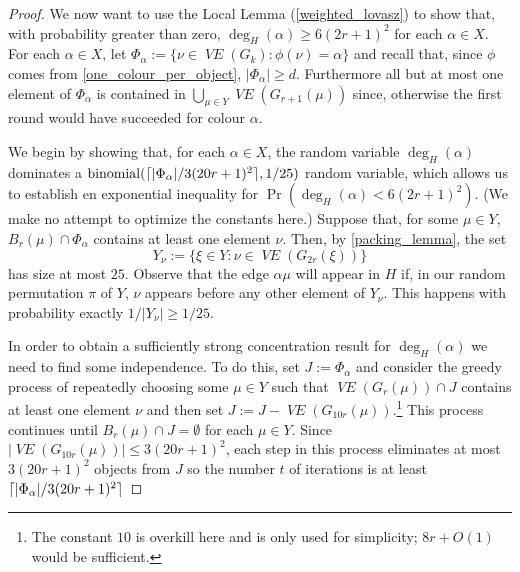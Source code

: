 \documentclass{patmorin}
\DeclareMathOperator{\binomial}{binomial}
\DeclareMathOperator{\VE}{\mathit{VE}}
\begin{document}
\begin{proof}
  We now want to use the Local Lemma (\cref{weighted_lovasz}) to show that, with probability greater than zero, $\deg_H(\alpha)\ge 6(2r+1)^2$ for each $\alpha\in X$.
  For each $\alpha\in X$, let $\Phi_\alpha:=\{\nu\in\VE(G_k):\phi(\nu)=\alpha\}$ and recall that, since $\phi$ comes from \cref{one_colour_per_object}, $|\Phi_\alpha| \ge d$.  Furthermore all but at most one element of $\Phi_\alpha$ is contained in $\bigcup_{\mu\in Y}\VE(G_{r+1}(\mu))$ since, otherwise the first round would have succeeded for colour $\alpha$.

  We begin by showing that, for each $\alpha\in X$, the random variable $\deg_H(\alpha)$ dominates a $\binomial(\ceil{|\Phi_\alpha|/3(20r+1)^2},1/25)$ random variable, which allows us to establish en exponential inequality for $\Pr(\deg_H(\alpha) < 6(2r+1)^2)$.  (We make no attempt to optimize the constants here.)  Suppose that, for some $\mu\in Y$, $B_r(\mu)\cap \Phi_\alpha$ contains at least one element $\nu$. Then, by \cref{packing_lemma}, the set
  \[
     Y_\nu := \{\xi\in Y:\nu\in\VE(G_{2r}(\xi))\}
  \]
  has size at most $25$. Observe that the edge $\alpha\mu$ will appear in $H$ if, in our random permutation $\pi$ of $Y$, $\nu$ appears before any other element of $Y_\nu$.  This happens with probability exactly $1/|Y_\nu|\ge 1/25$.

  In order to obtain a sufficiently strong concentration result for $\deg_H(\alpha)$ we need to find some independence.  To do this, set $J:=\Phi_\alpha$ and consider the greedy process of repeatedly choosing some $\mu\in Y$ such that $\VE(G_r(\mu))\cap J$ contains at least one element $\nu$ and then set $J:=J-\VE(G_{10r}(\mu))$.\footnote{The constant $10$ is overkill here and is only used for simplicity; $8r+O(1)$ would be sufficient.}  This process continues until $B_r(\mu)\cap J=\emptyset$ for each $\mu\in Y$. Since $|\VE(G_{10r}(\mu))|\le 3(20r+1)^2$, each step in this process eliminates at most $3(20r+1)^2$ objects from $J$ so the number $t$ of iterations is at least ${\lceil |\Phi_\alpha|/3(20r+1)^2 \rceil}$
  

\end{proof}
\end{document}
